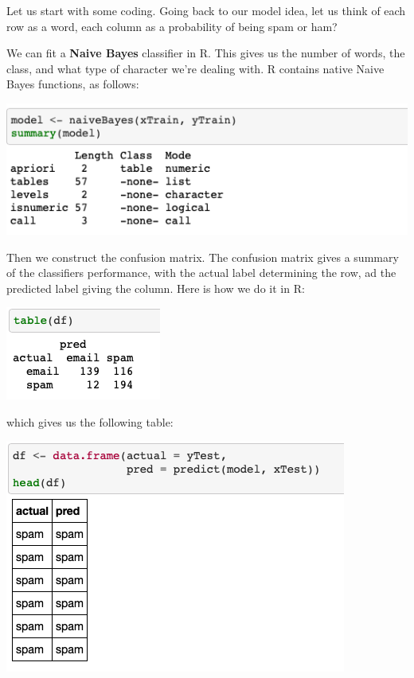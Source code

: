 Let us start with some coding. Going back to our model idea, let us think of each row as a word, each column as a probability of being spam or ham?

We can fit a \textbf{Naive Bayes} classifier in R. This gives us the number of words, the class, and what type of character we're dealing with. R contains native Naive Bayes functions, as follows:

\includegraphics[scale=0.40]{ask2256/figures/naivebayes.png}

Then we construct the confusion matrix. The confusion matrix gives a summary of the classifiers performance, with the actual label determining the row, ad the predicted label giving the column. Here is how we do it in R:

\includegraphics[scale=0.40]{ask2256/figures/confusion.png}

which gives us the following table:

\includegraphics[scale=0.40]{ask2256/figures/confusionmatrix.png}

